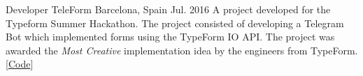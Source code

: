 


\begin{cventries}

\cventry
  {Developer}
  {TeleForm}
  {Barcelona, Spain}
  {Jul. 2016}
  {
    A project developed for the Typeform Summer Hackathon. The project consisted of
    developing a Telegram Bot which implemented forms using the TypeForm IO API\@.
    The project was awarded the \textit{Most Creative} implementation idea
    by the engineers from TypeForm.
    [\href{https://github.com/albertomontesg/typeformHack}{Code}]
  }

\end{cventries}

\filbreak


